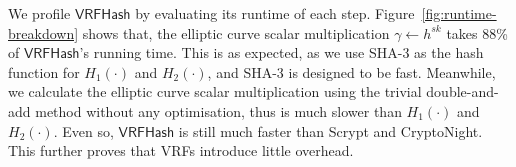 We profile $\mathsf{VRFHash}$ by evaluating its runtime of each step.
Figure~\ref{fig:runtime-breakdown} shows that, the elliptic curve scalar multiplication $\gamma \gets h^{sk}$ takes 88\% of $\mathsf{VRFHash}$'s running time.
This is as expected, as we use SHA-3 as the hash function for $H_1(\cdot)$ and $H_2(\cdot)$, and SHA-3 is designed to be fast.
Meanwhile, we calculate the elliptic curve scalar multiplication using the trivial double-and-add method without any optimisation, thus is much slower than $H_1(\cdot)$ and $H_2(\cdot)$.
Even so, $\mathsf{VRFHash}$ is still much faster than Scrypt and CryptoNight.
This further proves that VRFs introduce little overhead.